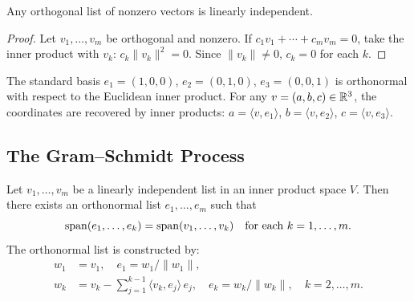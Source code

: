 \documentclass[11pt,a4paper]{article}
\begin{document}
\begin{proposition}
\label{prop:orth_indep}
Any orthogonal list of nonzero vectors is linearly independent.
\end{proposition}

\begin{proof}
Let $v_1, \ldots, v_m$ be orthogonal and nonzero.  If
$c_1 v_1 + \cdots + c_m v_m = 0$, take the inner product with $v_k$:
$c_k \|v_k\|^2 = 0$.  Since $\|v_k\| \neq 0$, $c_k = 0$ for each $k$.
\end{proof}

\begin{example}
\label{ex:onb_R3}
The standard basis $e_1 = (1,0,0)$, $e_2 = (0,1,0)$, $e_3 = (0,0,1)$
is orthonormal with respect to the Euclidean inner product.  For any
$v = (a,b,c) \in \mathbb{R}^3$, the coordinates are recovered by inner products:
$a = \langle v, e_1 \rangle$, $b = \langle v, e_2 \rangle$,
$c = \langle v, e_3 \rangle$.
\end{example}

\subsection{The Gram--Schmidt Process}

\begin{theorem}
\label{thm:gram_schmidt}
Let $v_1, \ldots, v_m$ be a linearly independent list in an inner product
space $V$.  Then there exists an orthonormal list $e_1, \ldots, e_m$ such
that
\[
  \operatorname{span}(e_1, \ldots, e_k) = \operatorname{span}(v_1, \ldots, v_k)
  \quad \text{for each } k = 1, \ldots, m.
\]
The orthonormal list is constructed by:
\begin{align*}
  w_1 &= v_1, \quad e_1 = w_1 / \|w_1\|, \\
  w_k &= v_k - \sum_{j=1}^{k-1} \langle v_k, e_j \rangle\, e_j,
         \quad e_k = w_k / \|w_k\|,
         \quad k = 2, \ldots, m.
\end{align*}
\end{theorem}
\end{document}
